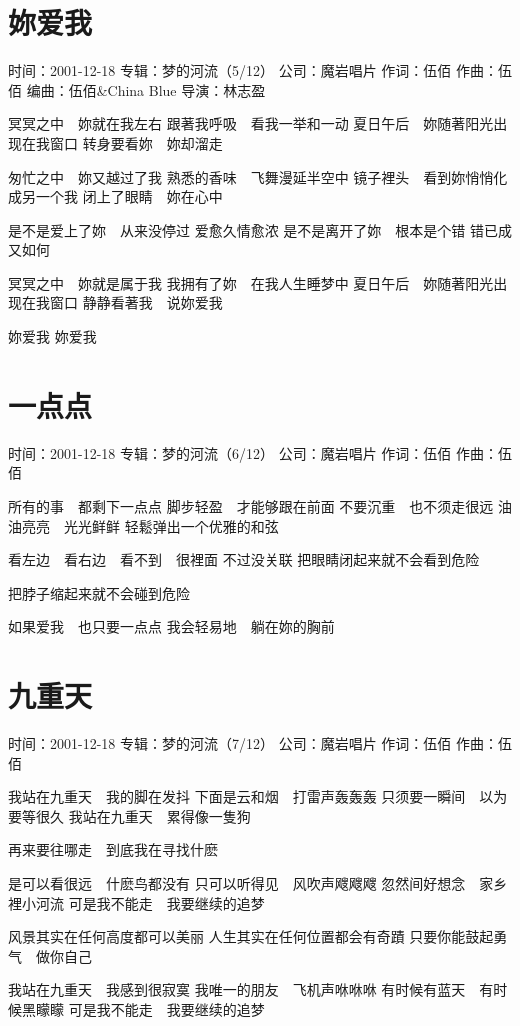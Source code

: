 \documentclass[UTF8,a4paper,oneside,twocolumn,12pt]{ctexbook}
\newcommand{\infopair}[2]{\textbullet #1：#2}
\newcommand{\zc}[1][伍佰]{\infopair{作词}{#1}}
\newcommand{\zq}[1][伍佰]{\infopair{作曲}{#1}}
\newcommand{\bq}[1][伍佰]{\infopair{编曲}{#1}}
\newcommand{\zj}[1]{\infopair{专辑}{#1}}
\newcommand{\sj}[1]{\infopair{时间}{#1}}
\newcommand{\gs}[1]{\infopair{公司}{#1}}
\newenvironment{info}{\begin{flushleft}\kaishu
	}
	{\end{flushleft}\normalsize\yahei\par}
\newenvironment{lyric}{
	}
{}
\begin{document}
\section{妳爱我}
\begin{info}
	\sj{2001-12-18}
	\zj{梦的河流（5/12）}
	\gs{魔岩唱片}
	\zc
	\zq
	\bq[伍佰\&China Blue]
	\infopair{导演}{林志盈}
\end{info}
\begin{lyric}
	冥冥之中　妳就在我左右
	跟著我呼吸　看我一举和一动
	夏日午后　妳随著阳光出现在我窗口
	转身要看妳　妳却溜走

	匆忙之中　妳又越过了我
	熟悉的香味　飞舞漫延半空中
	镜子裡头　看到妳悄悄化成另一个我
	闭上了眼睛　妳在心中

	是不是爱上了妳　从来没停过
	爱愈久情愈浓
	是不是离开了妳　根本是个错
	错已成又如何

	冥冥之中　妳就是属于我
	我拥有了妳　在我人生睡梦中
	夏日午后　妳随著阳光出现在我窗口
	静静看著我　说妳爱我

	妳爱我
	妳爱我
\end{lyric}

\section{一点点}
\begin{info}
	\sj{2001-12-18}
	\zj{梦的河流（6/12）}
	\gs{魔岩唱片}
	\zc
	\zq
\end{info}
\begin{lyric}
	所有的事　都剩下一点点
	脚步轻盈　才能够跟在前面
	不要沉重　也不须走很远
	油油亮亮　光光鲜鲜
	轻鬆弹出一个优雅的和弦

	看左边　看右边　看不到　很裡面
	不过没关联
	把眼睛闭起来就不会看到危险

	把脖子缩起来就不会碰到危险

	如果爱我　也只要一点点
	我会轻易地　躺在妳的胸前
\end{lyric}

\section{九重天}
\begin{info}
	\sj{2001-12-18}
	\zj{梦的河流（7/12）}
	\gs{魔岩唱片}
	\zc
	\zq
\end{info}
\begin{lyric}
	我站在九重天　我的脚在发抖
	下面是云和烟　打雷声轰轰轰
	只须要一瞬间　以为要等很久
	我站在九重天　累得像一隻狗

	再来要往哪走　到底我在寻找什麽

	是可以看很远　什麽鸟都没有
	只可以听得见　风吹声飕飕飕
	忽然间好想念　家乡裡小河流
	可是我不能走　我要继续的追梦

	风景其实在任何高度都可以美丽
	人生其实在任何位置都会有奇蹟
	只要你能鼓起勇气　做你自己

	我站在九重天　我感到很寂寞
	我唯一的朋友　飞机声咻咻咻
	有时候有蓝天　有时候黑矇矇
	可是我不能走　我要继续的追梦
\end{lyric}
\end{document}

